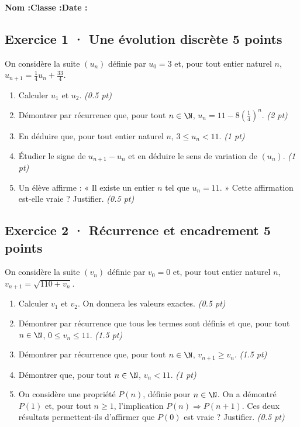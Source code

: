 \smallskip\textbf{Nom :}\enspace\dotfill\quad\textbf{Classe :}\enspace\dotfill\quad\textbf{Date :}\enspace\dotfill

\subsection*{Exercice 1 · Une évolution discrète \hfill 5 points}On considère la suite $(u_n)$ définie par $u_0=3$ et, pour tout entier naturel $n$, $u_{n+1}=\frac{1}{4}u_n+\frac{33}{4}$.

\begin{enumerate}

\item Calculer $u_1$ et $u_2$. \hfill\textit{(\num{0,5} pt)}

\item Démontrer par récurrence que, pour tout $n\in\N$, $u_n=11-8\left(\frac{1}{4}\right)^n$. \hfill\textit{(2 pt)}

\item En déduire que, pour tout entier naturel $n$, $3\le u_n<11$. \hfill\textit{(1 pt)}

\item Étudier le signe de $u_{n+1}-u_n$ et en déduire le sens de variation de $(u_n)$. \hfill\textit{(1 pt)}

\item Un élève affirme : « Il existe un entier $n$ tel que $u_n=11$. » Cette affirmation est-elle vraie ? Justifier. \hfill\textit{(\num{0,5} pt)}

\end{enumerate}

\subsection*{Exercice 2 · Récurrence et encadrement \hfill 5 points}On considère la suite $(v_n)$ définie par $v_0=0$ et, pour tout entier naturel $n$, $v_{n+1}=\sqrt{110+v_n}$.

\begin{enumerate}

\item Calculer $v_1$ et $v_2$. On donnera les valeurs exactes. \hfill\textit{(\num{0,5} pt)}

\item Démontrer par récurrence que tous les termes sont définis et que, pour tout $n\in\N$, $0\le v_n\le11$. \hfill\textit{(\num{1,5} pt)}

\item Démontrer par récurrence que, pour tout $n\in\N$, $v_{n+1}\ge v_n$. \hfill\textit{(\num{1,5} pt)}

\item Démontrer que, pour tout $n\in\N$, $v_n<11$. \hfill\textit{(1 pt)}

\item On considère une propriété $P(n)$, définie pour $n\in\N$. On a démontré $P(1)$ et, pour tout $n\ge1$, l'implication $P(n)\Rightarrow P(n+1)$. Ces deux résultats permettent-ils d'affirmer que $P(0)$ est vraie ? Justifier. \hfill\textit{(\num{0,5} pt)}

\end{enumerate}

